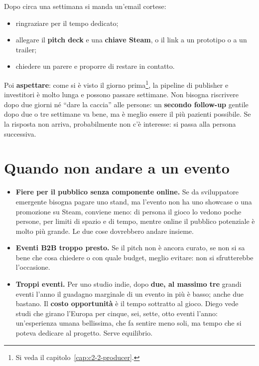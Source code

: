 Dopo circa una settimana si manda un'email cortese:
\begin{itemize}
  \item ringraziare per il tempo dedicato;
  \item allegare il \textbf{pitch deck} e una \textbf{chiave Steam}, o il link a
        un prototipo o a un trailer;
  \item chiedere un parere e proporre di restare in contatto.
\end{itemize}
Poi \textbf{aspettare}: come si è visto il giorno
prima\footnote{Si veda il capitolo~\ref{cap:c2-2-producer}.}, la pipeline di
publisher e investitori è molto lunga e possono passare settimane. Non bisogna
riscrivere dopo due giorni né ``dare la caccia'' alle persone: un \textbf{secondo
follow-up} gentile dopo due o tre settimane va bene, ma è meglio essere il più
pazienti possibile. Se la risposta non arriva, probabilmente non c'è interesse: si
passa alla persona successiva.

\section{Quando non andare a un evento}
\label{sec:c3-1-quando-no}

\begin{itemize}
  \item \textbf{Fiere per il pubblico senza componente online.} Se da sviluppatore
        emergente bisogna pagare uno stand, ma l'evento non ha uno showcase o una
        promozione su Steam, conviene meno: di persona il gioco lo vedono poche
        persone, per limiti di spazio e di tempo, mentre online il pubblico
        potenziale è molto più grande. Le due cose dovrebbero andare insieme.
  \item \textbf{Eventi B2B troppo presto.} Se il pitch non è ancora curato, se non
        si sa bene che cosa chiedere o con quale budget, meglio evitare: non si
        sfrutterebbe l'occasione.
  \item \textbf{Troppi eventi.} Per uno studio indie, dopo \textbf{due, al massimo
        tre} grandi eventi l'anno il guadagno marginale di un evento in più è
        basso; anche due bastano. Il \textbf{costo opportunità} è il tempo
        sottratto al gioco. Diego vede studi che girano l'Europa per cinque, sei,
        sette, otto eventi l'anno: un'esperienza umana bellissima, che fa sentire
        meno soli, ma tempo che si poteva dedicare al progetto. Serve equilibrio.
\end{itemize}


